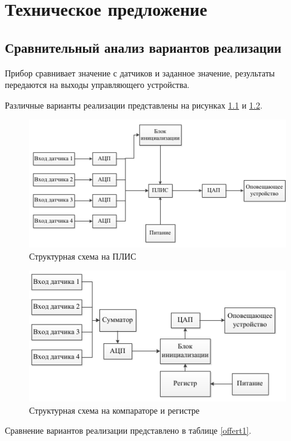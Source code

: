 \chapter{Техническое предложение}
	\section{Сравнительный анализ вариантов реализации}
		Прибор сравнивает значение с датчиков и заданное значение, результаты передаются на выходы управляющего устройства.

		Различные варианты реализации представлены на рисунках \ref{offerp1} и \ref{offerp2}.
		\begin{figure}[ht!]
			\centering
			\includegraphics[width=150mm]{src/pictures/offerp1.png}
			\caption{Структурная схема на ПЛИС}\label{offerp1}
		\end{figure}
		\begin{figure}[ht!]
			\centering
			\includegraphics[width=150mm]{src/pictures/offerp2.png}
			\caption{Структурная схема на компараторе и регистре}\label{offerp2}
		\end{figure}

		Сравнение вариантов реализации представлено в таблице \ref{offert1}.
		

